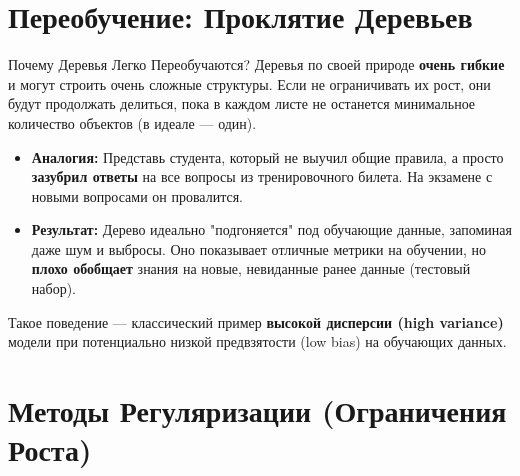 \section{Переобучение: Проклятие Деревьев}

\begin{alerttextbox}{Почему Деревья Легко Переобучаются?}
    Деревья по своей природе \textbf{очень гибкие} и могут строить очень сложные структуры. Если не ограничивать их рост, они будут продолжать делиться, пока в каждом листе не останется минимальное количество объектов (в идеале — один).
    \begin{itemize}
        \item \textbf{Аналогия:} Представь студента, который не выучил общие правила, а просто \textbf{зазубрил ответы} на все вопросы из тренировочного билета. На экзамене с новыми вопросами он провалится.
        \item \textbf{Результат:} Дерево идеально "подгоняется" под обучающие данные, запоминая даже шум и выбросы. Оно показывает отличные метрики на обучении, но \textbf{плохо обобщает} знания на новые, невиданные ранее данные (тестовый набор).
    \end{itemize}
    Такое поведение — классический пример \textbf{высокой дисперсии (high variance)} модели при потенциально низкой предвзятости (low bias) на обучающих данных.
\end{alerttextbox}

\section{Методы Регуляризации (Ограничения Роста)}

